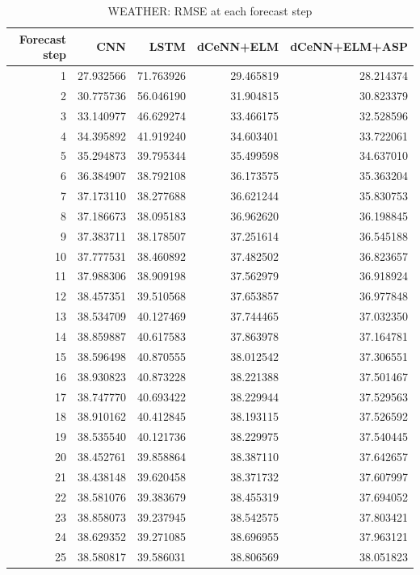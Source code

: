 \begin{table}
\caption{WEATHER: RMSE at each forecast step}
\begin{tabular}{rrrrr}
\toprule
Forecast step & CNN & LSTM & dCeNN+ELM & dCeNN+ELM+ASP \\
\midrule
1 & 27.932566 & 71.763926 & 29.465819 & 28.214374 \\
2 & 30.775736 & 56.046190 & 31.904815 & 30.823379 \\
3 & 33.140977 & 46.629274 & 33.466175 & 32.528596 \\
4 & 34.395892 & 41.919240 & 34.603401 & 33.722061 \\
5 & 35.294873 & 39.795344 & 35.499598 & 34.637010 \\
6 & 36.384907 & 38.792108 & 36.173575 & 35.363204 \\
7 & 37.173110 & 38.277688 & 36.621244 & 35.830753 \\
8 & 37.186673 & 38.095183 & 36.962620 & 36.198845 \\
9 & 37.383711 & 38.178507 & 37.251614 & 36.545188 \\
10 & 37.777531 & 38.460892 & 37.482502 & 36.823657 \\
11 & 37.988306 & 38.909198 & 37.562979 & 36.918924 \\
12 & 38.457351 & 39.510568 & 37.653857 & 36.977848 \\
13 & 38.534709 & 40.127469 & 37.744465 & 37.032350 \\
14 & 38.859887 & 40.617583 & 37.863978 & 37.164781 \\
15 & 38.596498 & 40.870555 & 38.012542 & 37.306551 \\
16 & 38.930823 & 40.873228 & 38.221388 & 37.501467 \\
17 & 38.747770 & 40.693422 & 38.229944 & 37.529563 \\
18 & 38.910162 & 40.412845 & 38.193115 & 37.526592 \\
19 & 38.535540 & 40.121736 & 38.229975 & 37.540445 \\
20 & 38.452761 & 39.858864 & 38.387110 & 37.642657 \\
21 & 38.438148 & 39.620458 & 38.371732 & 37.607997 \\
22 & 38.581076 & 39.383679 & 38.455319 & 37.694052 \\
23 & 38.858073 & 39.237945 & 38.542575 & 37.803421 \\
24 & 38.629352 & 39.271085 & 38.696955 & 37.963121 \\
25 & 38.580817 & 39.586031 & 38.806569 & 38.051823 \\

\end{tabular}
\end{table}
